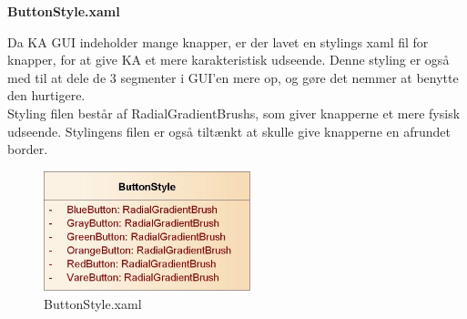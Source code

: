 \textbf{ButtonStyle.xaml}

Da \gls{KA} \gls{GUI} indeholder mange knapper, er der lavet en stylings xaml fil for knapper, for at give \gls{KA} et mere karakteristisk udseende. Denne styling er også med til at dele de 3 segmenter i GUI'en mere op, og gøre det nemmer at benytte den hurtigere. \\
Styling filen består af RadialGradientBrushs, som giver knapperne et mere fysisk udseende. Stylingens filen er også tiltænkt at skulle give knapperne en afrundet border.

\begin{figure}[H]
	\centering
	\includegraphics[width=60mm]{Systemdesign/Frontend/GUI/Pics/xaml}
	\caption{ButtonStyle.xaml}
	\label{fig:ButtonStyleXaml}
\end{figure}
